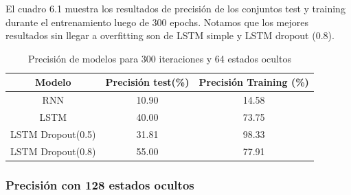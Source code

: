 \newpage
El cuadro 6.1 muestra los resultados de precisión de los conjuntos test y training durante el entrenamiento luego de 300 epochs. Notamos que los mejores resultados sin llegar a overfitting son de LSTM simple y LSTM dropout (0.8).
\begin{table}[H]
	\centering
	\begin{tabular}{|c|c|c|}
		\hline
		\rowcolor{Gray}  Modelo & Precisión test(\%) & Precisión Training (\%)\\ \hline
		RNN &      10.90   &                14.58  \\ \hline
		
		LSTM &        40.00 &          73.75       \\ \hline
		
		LSTM Dropout(0.5)&  31.81    &     98.33       \\ \hline
		
		LSTM Dropout(0.8)&	55.00		&	77.91		\\ \hline
		
	\end{tabular}
	\caption{Precisión de modelos para 300 iteraciones y 64 estados ocultos}
\end{table}


\subsubsection{Precisión con 128 estados ocultos}

